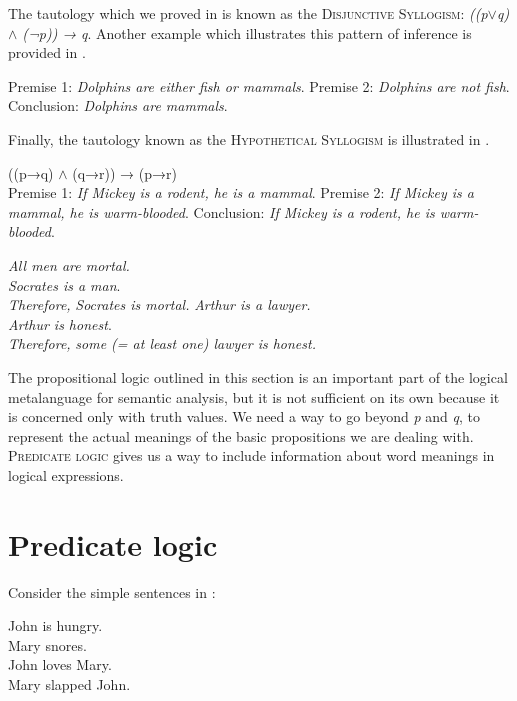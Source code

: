 The tautology which we proved in  is known as the \textsc{Disjunctive Syllogism}: \textit{((p$\vee$q) $\wedge$ (¬p)) → q}. Another example which illustrates this pattern of inference is provided in .


\ea \label{ex:4.19}
Premise 1: \textit{Dolphins are either fish or mammals}.  
Premise 2: \textit{Dolphins are not fish}.  
\FelixHRule
Conclusion: \textit{Dolphins are mammals}.   
\z


Finally, the tautology known as the \textsc{Hypothetical} \textsc{Syllogism} is illustrated in .


\ea \label{ex:4.20}
((p→q) $\wedge$ (q→r)) → (p→r)\\
Premise 1: \textit{If Mickey is a rodent, he is a mammal}.  
Premise 2: \textit{If Mickey is a mammal, he is warm-blooded}.  
\FelixHRule
Conclusion: \textit{If Mickey is a rodent, he is warm-blooded}.  
\z

\ea \label{ex:4.21}
\ea \textit{All men are mortal.}\\
\textit{Socrates is a man}.\\
\FelixHRule
\textit{Therefore,} \textit{Socrates is mortal.}
\ex \textit{Arthur is a lawyer.}\\
\textit{Arthur is honest}.\\
\FelixHRule
\textit{Therefore,} \textit{some (= at least one) lawyer is honest.}
\z \z

The propositional logic outlined in this section is an important part of the logical metalanguage for semantic analysis, but it is not sufficient on its own because it is concerned only with truth values. We need a way to go beyond \textit{p} and \textit{q}, to represent the actual meanings of the basic propositions we are dealing with. \textsc{Predicate logic} gives us a way to include information about word meanings in logical expressions.


\section{Predicate logic}\label{sec:} %

Consider the simple sentences in :


\ea \label{ex:4.22}
\ea John is hungry.\\
\ex Mary snores.\\
\ex John loves Mary.\\
\ex Mary slapped John.
                       \z
\z


